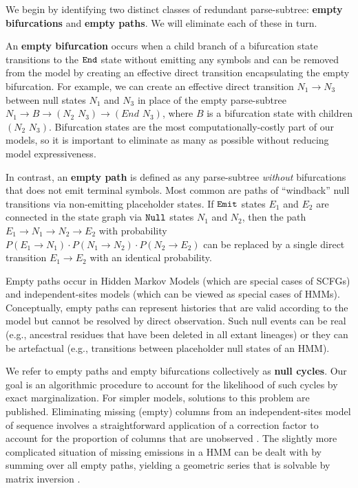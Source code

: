 \documentclass[10pt]{article}
\begin{document}
We begin by identifying two distinct classes of redundant parse-subtree: {\bf empty bifurcations} and {\bf empty paths}.
We will eliminate each of these in turn.

An {\bf empty bifurcation} occurs when a child branch of a bifurcation state
transitions to the $\mathtt{End}$ state without emitting any symbols and can
be removed from the model by creating an effective direct transition
encapsulating the empty bifurcation.  For
example, we can create an effective direct transition $N_1 \rightarrow
N_3$ between null states $N_1$ and $N_3$ in place of the empty
parse-subtree $N_1 \rightarrow B \rightarrow (N_2 \,\, N_3) \rightarrow
(End \,\, N_3)$, where $B$ is a bifurcation state with children $(N_2
\,\, N_3)$. Bifurcation states are the most computationally-costly
part of our models, so it is important to eliminate as many as
possible without reducing model expressiveness.

In contrast, an {\bf empty path} is defined as any parse-subtree {\em without} bifurcations that does not emit terminal symbols.
Most common are paths of ``windback'' null transitions via non-emitting placeholder states.
If $\mathtt{Emit}$ states $E_1$ and $E_2$ are connected in the state
graph via $\mathtt{Null}$ states $N_1$ and $N_2$, then the path $E_1
\rightarrow N_1 \rightarrow N_2 \rightarrow E_2$ with  probability
$P(E_1 \rightarrow N_1) \cdot P(N_1 \rightarrow N_2) \cdot P(N_2
\rightarrow E_2)$ can be replaced by a single direct transition $E_1 \rightarrow
E_2$ with an identical probability.


Empty paths occur in Hidden Markov Models (which are special cases of SCFGs)
and independent-sites models (which can be viewed as special cases of HMMs).
Conceptually, empty paths can represent histories that are valid
according to the model but cannot be resolved by direct observation.
Such null events can be real (e.g., ancestral residues that have been deleted in all extant lineages)
or they can be artefactual (e.g., transitions between placeholder null states of an HMM).

We refer to empty paths and empty bifurcations collectively as {\bf null cycles}.
Our goal is an algorithmic procedure to account for the likelihood of such cycles by exact marginalization.
For simpler models, solutions to this problem are published.
Eliminating missing (empty) columns from an independent-sites model of sequence involves a straightforward application of a correction factor
to account for the proportion of columns that are unobserved \cite{RivasEddy2008}.
The slightly more complicated situation of missing emissions in a HMM can be dealt with by
summing over all empty paths, yielding a geometric series that is solvable by matrix inversion
\cite{Holmes2003,Holmes2007,Lunter2007}.
\end{document}
